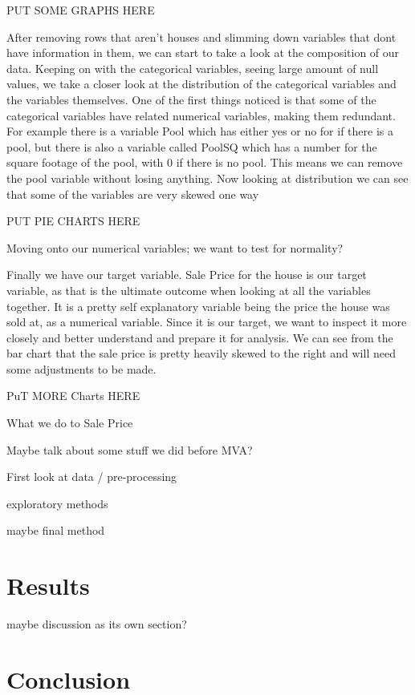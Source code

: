 \documentclass{article}
\begin{document}
	PUT SOME GRAPHS HERE
	 
	After removing rows that aren't houses and slimming down variables that dont have information in them, we can start to take a look at the composition of our data. Keeping on with the categorical 
	variables, seeing large amount of null values, we take a closer look at the distribution of the categorical variables and the variables themselves. One of the first things noticed is that some of the categorical variables have related numerical variables, making them redundant. For example there is a variable Pool which has either yes or no for if there is a pool, but there is also a variable called PoolSQ which has a number for the square footage of the pool, with 0 if there is no pool. This means we can remove the pool variable without losing anything. Now looking at distribution we can see that some of the variables are very skewed one way
	
	PUT PIE CHARTS HERE
	
	Moving onto our numerical variables; we want to test for normality?
	
	Finally we have our target variable. Sale Price for the house is our target variable, as that is the ultimate outcome when looking at all the variables together. It is a pretty self explanatory variable being the price the house was sold at, as a numerical variable. Since it is our target, we want to inspect it more closely and better understand and prepare it for analysis. We can see from the bar chart that the sale price is pretty heavily skewed to the right and will need some adjustments to be made.
	
	PuT MORE Charts HERE
	
	What we do to Sale Price
	
	
	Maybe talk about some stuff we did before MVA?
	
	
	First look at data / pre-processing
	
	exploratory methods
	
	maybe final method
	
	
	\section{Results}
	
	
	maybe discussion as its own section?
	
	
	\section{Conclusion}
	
	
\end{document}
